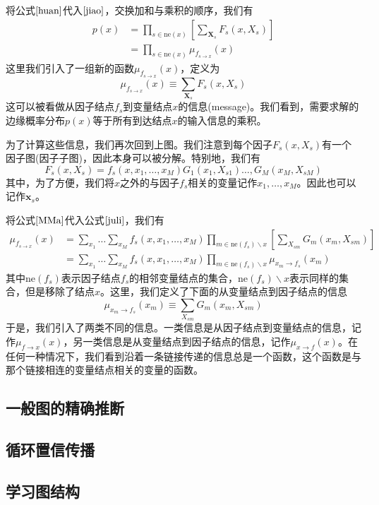 将公式$\ref{huan}$代入$\ref{jiao}$，交换加和与乘积的顺序，我们有
\begin{equation}
	\begin{aligned}
		p(x)&=\prod_{s\in \mathrm{ne}(x)}\left[\sum_{\boldsymbol{X}_s}F_s(x,X_s) \right]\\
		&=\prod_{s\in \mathrm{ne}(x)}\mu_{f_{s\to x}}(x)
	\end{aligned}
\end{equation}
这里我们引入了一组新的函数$\mu_{f_{s\to x}}(x)$，定义为
\begin{equation}
\label{juli}
	\mu_{f_{s\to x}}(x)\equiv \sum_{\boldsymbol{X}_s}F_s(x,X_s)
\end{equation}
这可以被看做从因子结点$f_s$到变量结点$x$的信息(message)。我们看到，需要求解的边缘概率分布$p(x)$等于所有到达结点$x$的输入信息的乘积。

为了计算这些信息，我们再次回到上图。我们注意到每个因子$F_s(x,X_s)$有一个因子图(因子子图)，因此本身可以被分解。特别地，我们有
\begin{equation}
\label{MMa}
	F_s(x,X_s)=f_s(x,x_1,\dots,x_M)G_1(x_1,X_{s1})\dots,G_M(x_M,X_{sM})
\end{equation}
其中，为了方便，我们将$x$之外的与因子$f_s$相关的变量记作$x_1,\dots,x_M$。因此也可以记作$\boldsymbol{x}_s$。

将公式$\ref{MMa}$代入公式$\ref{juli}$，我们有
\begin{equation}
	\begin{aligned}
	\mu_{f_{s\to x}}(x)&=\sum_{x_1}\dots\sum_{x_M}f_s(x,x_1,\dots,x_M)\prod_{m\in \mathrm{ne}(f_s)\backslash x}\left[\sum_{X_{sm}}G_m(x_m,X_{sm}) \right]\\
	&=\sum_{x_1}\dots\sum_{x_M}f_s(x,x_1,\dots,x_M)\prod_{m\in \mathrm{ne}(f_s)\backslash x}\mu_{x_{m}\to f_s}(x_m)
	\end{aligned}
\end{equation}
其中$\mathrm{ne}(f_s)$表示因子结点$f_s$的相邻变量结点的集合，$\mathrm{ne}(f_s)\backslash x$表示同样的集合，但是移除了结点$x$。这里，我们定义了下面的从变量结点到因子结点的信息
\begin{equation}
	\mu_{x_{m}\to f_s}(x_m)\equiv \sum_{X_{sm}}G_m(x_m,X_{sm})
\end{equation}
于是，我们引入了两类不同的信息。一类信息是从因子结点到变量结点的信息，记作$\mu_{f\to x}(x)$，另一类信息是从变量结点到因子结点的信息，记作$\mu_{x\to f}(x)$。在任何一种情况下，我们看到沿着一条链接传递的信息总是一个函数，这个函数是与那个链接相连的变量结点相关的变量的函数。
\subsection*{一般图的精确推断}
\subsection*{循环置信传播}
\subsection*{学习图结构}
